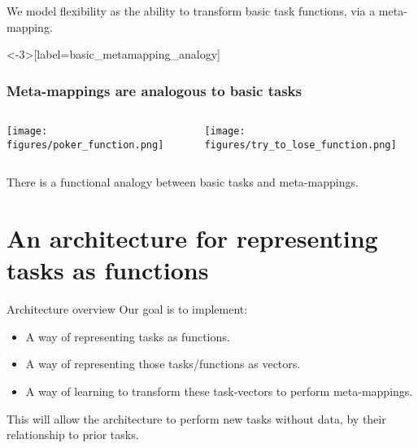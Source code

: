 \documentclass{beamer}
\begin{document}
\begin{frame}[standout]
We model flexibility as the ability to transform basic task functions, via a meta-mapping. 
\end{frame}

\begin{frame}<-3>[label=basic_metamapping_analogy]
\frametitle{Meta-mappings are analogous to basic tasks}
\begin{columns}
\begin{column}{0.5\textwidth}
\vspace{2em}
\texttt{[image: figures/poker\_function.png]}
\end{column}
\begin{column}{0.5\textwidth}
\vspace{2em}
\texttt{[image: figures/try\_to\_lose\_function.png]}
\end{column}
\end{columns}
\end{frame}

\begin{frame}[standout]
There is a functional analogy between basic tasks and meta-mappings.
\end{frame}

\section{An architecture for representing tasks as functions}

\begin{frame}{Architecture overview}
Our goal is to implement:
\begin{itemize}
\item A way of representing tasks as functions.
\item A way of representing those tasks/functions as vectors.
\item A way of learning to transform these task-vectors to perform meta-mappings.
\end{itemize}
This will allow the architecture to perform new tasks without data, by their relationship to prior tasks.
\end{frame}
\end{document}
